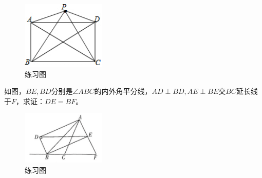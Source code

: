 \documentclass{ecnuthesis}
\begin{document}
\begin{figure}[H]
\centering
\includegraphics[width=4cm]{picture/639.png}
\caption{练习图}
\end{figure}
\begin{problem}
    如图，$BE,BD$分别是$\angle ABC$的内外角平分线，$AD\perp BD,AE\perp BE$交$BC$延长线于$F$，求证：$DE=BF$。 \\
\end{problem}
\begin{figure}[H]
\centering
\includegraphics[width=4cm]{picture/641.png}
\caption{练习图}
\end{figure}
\clearpage
\end{document}
